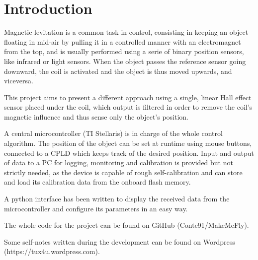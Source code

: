 \section{Introduction}
Magnetic levitation is a common task in control, consisting in keeping an object floating in mid-air by pulling it in a controlled manner with an electromagnet from the top, and is usually performed using a serie of binary position sensors, like infrared or light sensors. When the object passes the reference sensor going downward, the coil is activated and the object is thus moved upwards, and viceversa.

This project aims to present a different approach using a single, linear Hall effect sensor placed under the coil, which output is filtered in order to remove the coil's magnetic influence and thus sense only the object's position.

A central microcontroller (TI Stellaris) is in charge of the whole control algorithm. The position of the object can be set at runtime using mouse buttons, connected to a CPLD which keeps track of the desired position. Input and output of data to a PC for logging, monitoring and calibration is provided but not strictly needed, as the device is capable of rough self-calibration and can store and load its calibration data from the onboard flash memory.

A python interface has been written to display the received data from the microcontroller and configure its parameters in an easy way.

The whole code for the project can be found on GitHub (Conte91/MakeMeFly).

Some self-notes written during the development can be found on Wordpress (https://tux4u.wordpress.com).
